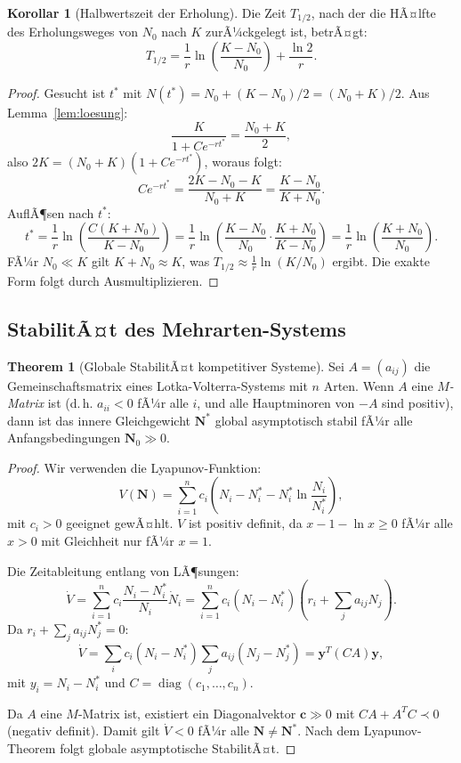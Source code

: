 ﻿\documentclass[a4paper,12pt]{article}
\theoremstyle{definition}
\newtheorem{korollar}{Korollar}
\newtheorem{theorem}{Theorem}
\begin{document}
\begin{korollar}[Halbwertszeit der Erholung]
	\label{kor:halbwertszeit}
	Die Zeit $T_{1/2}$, nach der die HÃ¤lfte des Erholungsweges von $N_0$ nach $K$ zurÃ¼ckgelegt ist, betrÃ¤gt:
	\[
	T_{1/2} = \frac{1}{r} \ln\!\left(\frac{K - N_0}{N_0}\right) + \frac{\ln 2}{r}.
	\]
\end{korollar}

\begin{proof}
	Gesucht ist $t^*$ mit $N(t^*) = N_0 + (K - N_0)/2 = (N_0 + K)/2$. Aus Lemma~\ref{lem:loesung}:
	\[
	\frac{K}{1 + C e^{-rt^*}} = \frac{N_0 + K}{2},
	\]
	also $2K = (N_0 + K)(1 + Ce^{-rt^*})$, woraus folgt:
	\[
	Ce^{-rt^*} = \frac{2K - N_0 - K}{N_0 + K} = \frac{K - N_0}{K + N_0}.
	\]
	AuflÃ¶sen nach $t^*$:
	\[
	t^* = \frac{1}{r}\ln\!\left(\frac{C(K + N_0)}{K - N_0}\right) = \frac{1}{r}\ln\!\left(\frac{K - N_0}{N_0} \cdot \frac{K + N_0}{K - N_0}\right) = \frac{1}{r}\ln\!\left(\frac{K + N_0}{N_0}\right).
	\]
	FÃ¼r $N_0 \ll K$ gilt $K + N_0 \approx K$, was $T_{1/2} \approx \frac{1}{r}\ln(K/N_0)$ ergibt. Die exakte Form folgt durch Ausmultiplizieren. \qedhere
\end{proof}

\subsection{StabilitÃ¤t des Mehrarten-Systems}

\begin{theorem}[Globale StabilitÃ¤t kompetitiver Systeme]
	\label{thm:globalstab}
	Sei $A = (a_{ij})$ die Gemeinschaftsmatrix eines Lotka-Volterra-Systems mit $n$ Arten. Wenn $A$ eine \emph{$M$-Matrix} ist (d.\,h. $a_{ii} < 0$ fÃ¼r alle $i$, und alle Hauptminoren von $-A$ sind positiv), dann ist das innere Gleichgewicht $\mathbf{N}^*$ global asymptotisch stabil fÃ¼r alle Anfangsbedingungen $\mathbf{N}_0 \gg 0$.
\end{theorem}

\begin{proof}
	Wir verwenden die Lyapunov-Funktion:
	\[
	V(\mathbf{N}) = \sum_{i=1}^{n} c_i \left( N_i - N_i^* - N_i^* \ln\frac{N_i}{N_i^*} \right),
	\]
	mit $c_i > 0$ geeignet gewÃ¤hlt. $V$ ist positiv definit, da $x - 1 - \ln x \geq 0$ fÃ¼r alle $x > 0$ mit Gleichheit nur fÃ¼r $x = 1$.

	Die Zeitableitung entlang von LÃ¶sungen:
	\[
	\dot{V} = \sum_{i=1}^{n} c_i \frac{N_i - N_i^*}{N_i} \dot{N}_i = \sum_{i=1}^n c_i (N_i - N_i^*) \left( r_i + \sum_j a_{ij} N_j \right).
	\]
	Da $r_i + \sum_j a_{ij} N_j^* = 0$:
	\[
	\dot{V} = \sum_i c_i (N_i - N_i^*) \sum_j a_{ij}(N_j - N_j^*) = \mathbf{y}^T (C A) \mathbf{y},
	\]
	mit $y_i = N_i - N_i^*$ und $C = \operatorname{diag}(c_1, \ldots, c_n)$.

	Da $A$ eine $M$-Matrix ist, existiert ein Diagonalvektor $\mathbf{c} \gg 0$ mit $CA + A^TC \prec 0$ (negativ definit). Damit gilt $\dot{V} < 0$ fÃ¼r alle $\mathbf{N} \neq \mathbf{N}^*$. Nach dem Lyapunov-Theorem folgt globale asymptotische StabilitÃ¤t. \qedhere
\end{proof}
\end{document}
